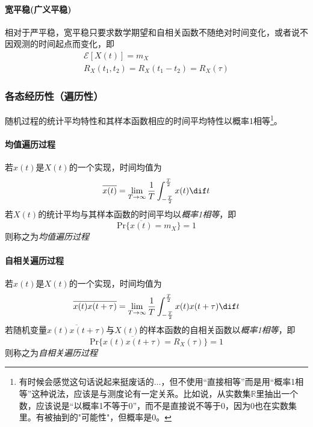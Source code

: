         \paragraph{宽平稳(广义平稳)}
        相对于严平稳，宽平稳只要求数学期望和自相关函数不随绝对时间变化，或者说不因观测的时间起点而变化，即
        \begin{align}
            \mathscr{E}[X(t)]=m_X\hspace{5em}\\
            R_X(t_1,t_2)=R_X(t_1-t_2)=R_X(\tau)
        \end{align}

    \subsubsection[各态经历性]{各态经历性（遍历性）}
    随机过程的统计平均特性和其样本函数相应的时间平均特性以概率1相等\footnote{有时候会感觉这句话说起来挺废话的$\ldots$，但不使用“直接相等”而是用“概率1相等”这种说法，应该是与测度论有一定关系。比如说，从实数集$\mathbb{R}$里抽出一个数，应该说是“以概率1不等于0”，而不是直接说不等于0，因为0也在实数集里。有被抽到的"可能性"，但概率是0。}。

    \paragraph{均值遍历过程}\mbox{}

    若$x(t)$是$X(t)$的一个实现，时间均值为
    \begin{equation}
        \overline{x(t)}=\lim_{T\to\infty}\frac{1}{T}\int_{-\frac{T}{2}}^{\frac{T}{2}}x(t)\dif t
    \end{equation}
    若$X(t)$的统计平均与其样本函数的时间平均以\emph{概率1相等}，即
    \begin{equation}
        \text{Pr}\{\overline{x(t)}=m_X \}=1
    \end{equation}
    则称之为\emph{均值遍历过程}

    \paragraph{自相关遍历过程}\mbox{}

    若$x(t)$是$X(t)$的一个实现，时间均值为
    \begin{equation}
        \overline{x(t)x(t+\tau)}=\lim_{T\to\infty}\frac{1}{T}\int_{-\frac{T}{2}}^{\frac{T}{2}}x(t)x(t+\tau)\dif t
    \end{equation}
    若随机变量$\overline{x(t)x(t+\tau)}$与$X(t)$的样本函数的自相关函数以\emph{概率1相等}，即
    \begin{equation}
        \text{Pr}\{\overline{x(t)x(t+\tau)}=R_X(\tau) \}=1
    \end{equation}
    则称之为\emph{自相关遍历过程}

